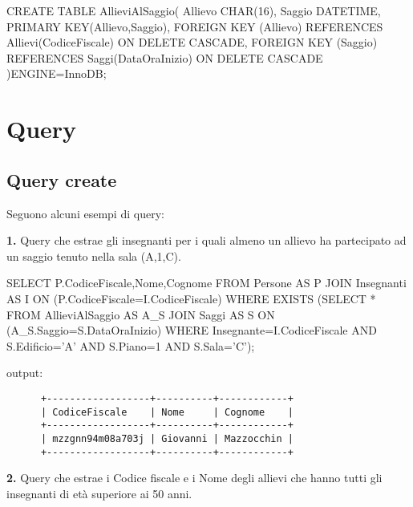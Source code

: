 \documentclass{article}
\begin{document}
\begin{small}
\begin{sql}
CREATE TABLE AllieviAlSaggio(
	Allievo	CHAR(16),
	Saggio DATETIME,
	PRIMARY KEY(Allievo,Saggio),
	FOREIGN KEY (Allievo) REFERENCES Allievi(CodiceFiscale) ON DELETE CASCADE,
	FOREIGN KEY (Saggio) REFERENCES Saggi(DataOraInizio) ON DELETE CASCADE
)ENGINE=InnoDB;



\end{sql}

\end{small}

\newpage

\section{Query}

\subsection{Query create}

Seguono alcuni esempi di query:\bigskip

\begin{flushleft}
\textbf{1.} Query che estrae gli insegnanti per i quali almeno un allievo ha partecipato ad un saggio tenuto nella sala (A,1,C).
\end{flushleft}

\begin{sql}[float=h]
SELECT P.CodiceFiscale,Nome,Cognome
FROM Persone AS P JOIN Insegnanti AS I ON (P.CodiceFiscale=I.CodiceFiscale)
WHERE EXISTS (SELECT * FROM AllieviAlSaggio AS A_S JOIN Saggi AS S 
		ON (A_S.Saggio=S.DataOraInizio)
		WHERE Insegnante=I.CodiceFiscale AND S.Edificio='A' AND S.Piano=1 AND S.Sala='C');
\end{sql}

\begin{flushleft}
output:
\end{flushleft}

\begin{verbatim}
      +------------------+----------+------------+
      | CodiceFiscale    | Nome     | Cognome    |
      +------------------+----------+------------+
      | mzzgnn94m08a703j | Giovanni | Mazzocchin |
      +------------------+----------+------------+
\end{verbatim}

\bigskip

\begin{flushleft}
\textbf{2.} Query che estrae i Codice fiscale e i Nome degli allievi che hanno tutti gli insegnanti di età superiore ai 50 anni.
\end{flushleft}
\end{document}
